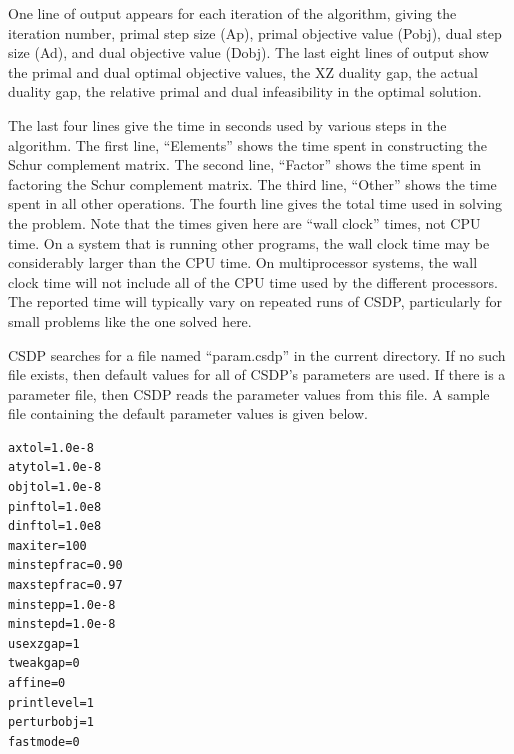 \documentclass{article}
\begin{document}
One line of output appears for each iteration of the algorithm, giving
the iteration number, primal step size (Ap), primal objective value
(Pobj), dual step size (Ad), and dual objective value (Dobj).  The
last eight lines of output show the primal and dual optimal objective
values, the XZ duality gap, the actual duality gap, the relative
primal and dual infeasibility in the optimal solution.

The last four lines give the time in seconds used by various steps in
the algorithm.  The first line, ``Elements'' shows the time spent in
constructing the Schur complement matrix.  The second line, ``Factor''
shows the time spent in factoring the Schur complement matrix.  The
third line, ``Other'' shows the time spent in all other operations.
The fourth line gives the total time used in solving the problem.
Note that the times given here are ``wall clock'' times, not CPU time.
On a system that is running other programs, the wall clock time may be
considerably larger than the CPU time.  On multiprocessor systems, the
wall clock time will not include all of the CPU time used by the
different processors.  The reported time will typically vary on
repeated runs of CSDP, particularly for small problems like the one
solved here.

CSDP searches for a file named ``param.csdp'' in the current directory.
If no such file exists, then default values for all of CSDP's parameters
are used.  If there is a parameter file, then CSDP reads the parameter
values from this file.  A sample file containing the default parameter
values is given below.

\begin{verbatim}
axtol=1.0e-8
atytol=1.0e-8
objtol=1.0e-8
pinftol=1.0e8
dinftol=1.0e8
maxiter=100
minstepfrac=0.90
maxstepfrac=0.97
minstepp=1.0e-8
minstepd=1.0e-8
usexzgap=1
tweakgap=0
affine=0
printlevel=1
perturbobj=1
fastmode=0
\end{verbatim}
\end{document}
